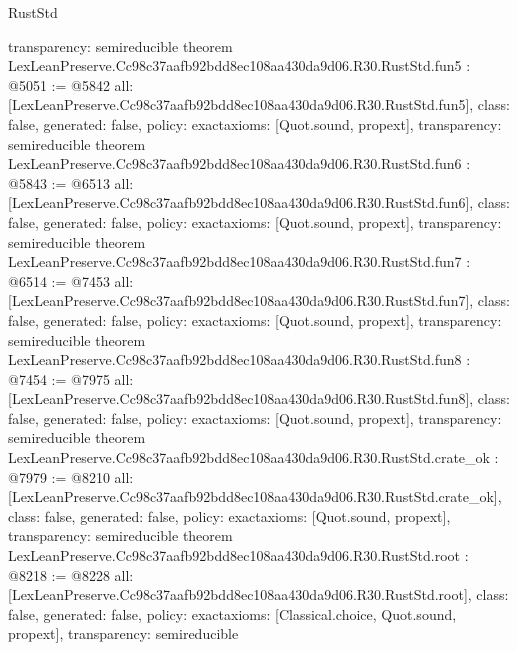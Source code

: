 \begin{lexlean}{RustStd}
\begin{coremodule}
{  transparency: semireducible
}
theorem LexLeanPreserve.Cc98c37aafb92bdd8ec108aa430da9d06.R30.RustStd.fun5 : @5051 := @5842 {
  all: [LexLeanPreserve.Cc98c37aafb92bdd8ec108aa430da9d06.R30.RustStd.fun5],
  class: false,
  generated: false,
  policy: exact{axioms: [Quot.sound, propext]},
  transparency: semireducible
}
theorem LexLeanPreserve.Cc98c37aafb92bdd8ec108aa430da9d06.R30.RustStd.fun6 : @5843 := @6513 {
  all: [LexLeanPreserve.Cc98c37aafb92bdd8ec108aa430da9d06.R30.RustStd.fun6],
  class: false,
  generated: false,
  policy: exact{axioms: [Quot.sound, propext]},
  transparency: semireducible
}
theorem LexLeanPreserve.Cc98c37aafb92bdd8ec108aa430da9d06.R30.RustStd.fun7 : @6514 := @7453 {
  all: [LexLeanPreserve.Cc98c37aafb92bdd8ec108aa430da9d06.R30.RustStd.fun7],
  class: false,
  generated: false,
  policy: exact{axioms: [Quot.sound, propext]},
  transparency: semireducible
}
theorem LexLeanPreserve.Cc98c37aafb92bdd8ec108aa430da9d06.R30.RustStd.fun8 : @7454 := @7975 {
  all: [LexLeanPreserve.Cc98c37aafb92bdd8ec108aa430da9d06.R30.RustStd.fun8],
  class: false,
  generated: false,
  policy: exact{axioms: [Quot.sound, propext]},
  transparency: semireducible
}
theorem LexLeanPreserve.Cc98c37aafb92bdd8ec108aa430da9d06.R30.RustStd.crate_ok : @7979 := @8210 {
  all: [LexLeanPreserve.Cc98c37aafb92bdd8ec108aa430da9d06.R30.RustStd.crate_ok],
  class: false,
  generated: false,
  policy: exact{axioms: [Quot.sound, propext]},
  transparency: semireducible
}
theorem LexLeanPreserve.Cc98c37aafb92bdd8ec108aa430da9d06.R30.RustStd.root : @8218 := @8228 {
  all: [LexLeanPreserve.Cc98c37aafb92bdd8ec108aa430da9d06.R30.RustStd.root],
  class: false,
  generated: false,
  policy: exact{axioms: [Classical.choice, Quot.sound, propext]},
  transparency: semireducible
}


\end{coremodule}
\end{lexlean}
